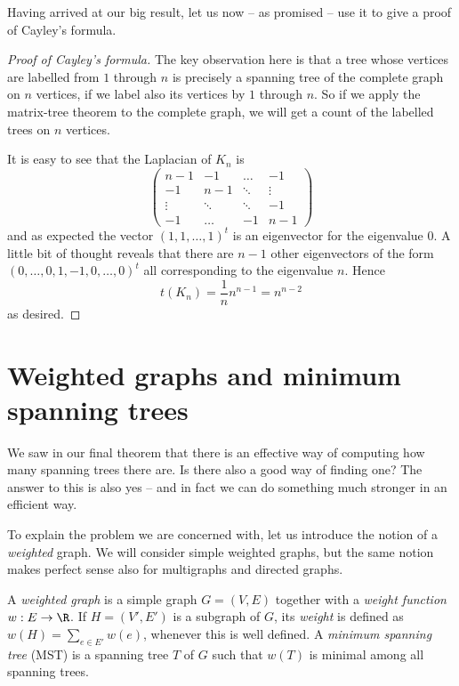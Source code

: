 \documentclass[nobib]{tufte-handout}
\begin{document}
Having arrived at our big result, let us now -- as promised -- use it to give a proof of Cayley's formula.

\begin{proof}[Proof of Cayley's formula]
    The key observation here is that a tree whose vertices are labelled from $1$ through $n$ is precisely a spanning tree of the complete graph on $n$ vertices, if we label also its vertices by $1$ through $n$. So if we apply the matrix-tree theorem to the complete graph, we will get a count of the labelled trees on $n$ vertices.

    It is easy to see that the Laplacian of $K_n$ is
    $$\begin{pmatrix}
        n-1 & -1 & \dots & -1 \\
        -1 & n-1 & \ddots & \vdots \\
        \vdots & \ddots & \ddots & -1 \\
        -1 & \dots & -1 & n-1
       \end{pmatrix}$$
    and as expected the vector $(1,1,\ldots,1)^t$ is an eigenvector for the eigenvalue $0$. A little bit of thought reveals that there are $n-1$ other eigenvectors of the form $(0,\ldots,0,1,-1,0,\ldots,0)^t$ all corresponding to the eigenvalue $n$. Hence
    $$t(K_n) = \frac{1}{n}n^{n-1} = n^{n-2}$$
    as desired.
\end{proof}

\section{Weighted graphs and minimum spanning trees}

We saw in our final theorem that there is an effective way of computing how many spanning trees there are. Is there also a good way of finding one? The answer to this is also yes -- and in fact we can do something much stronger in an efficient way.

To explain the problem we are concerned with, let us introduce the notion of a \emph{weighted} graph. We will consider simple weighted graphs, but the same notion makes perfect sense also for multigraphs and directed graphs.

\begin{definition}
    A \emph{weighted graph} is a simple graph $G = (V,E)$ together with a \emph{weight function} $w: E \to \R$. If $H = (V', E')$ is a subgraph of $G$, its \emph{weight} is defined as $w(H) = \sum_{e\in E'} w(e)$, whenever this is well defined. A \emph{minimum spanning tree} (MST) is a spanning tree $T$ of $G$ such that $w(T)$ is minimal among all spanning trees.
\end{definition}
\end{document}
